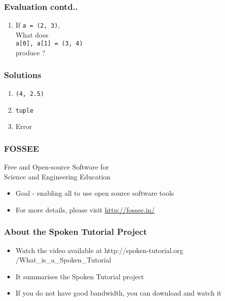 \documentclass[17pt,compress]{beamer}
\newcounter{saveenumi}
\newcommand{\conti}{\setcounter{enumi}{\value{saveenumi}}}
\begin{document}
\begin{frame}
\frametitle{Evaluation contd..}
\label{sec-6.2}

\begin{enumerate}
\conti
\item If \texttt{a = (2, 3)},\\ What does \\ \texttt{a[0], a[1] = (3, 4)} \\produce ?
\end{enumerate}
\end{frame}
\begin{frame}
\frametitle{Solutions}
\label{sec-7}


\begin{enumerate}
\item \texttt{(4, 2.5)}
\vspace{12pt}
\item \texttt{tuple}
\vspace{12pt}
\item Error
\end{enumerate}
\end{frame}
\begin{frame}
\frametitle{FOSSEE}
{\color{blue}Free and Open-source Software for \\Science and Engineering Education} \\
\begin{itemize}
\item Goal - enabling all to use open source software tools
\item For more details, please visit {\color{blue}\url{http://fossee.in/}}
\end{itemize}
\end{frame}
\begin{frame}
\frametitle{About the Spoken Tutorial Project}
\begin{itemize}
\item Watch the video available at {\color{blue}http://spoken-tutorial.org /What\_is\_a\_Spoken\_Tutorial}
\item It summarises the Spoken Tutorial project \pause
\item If you do not have good bandwidth, you can download and watch it
\end{itemize}
\end{frame}
\end{document}

